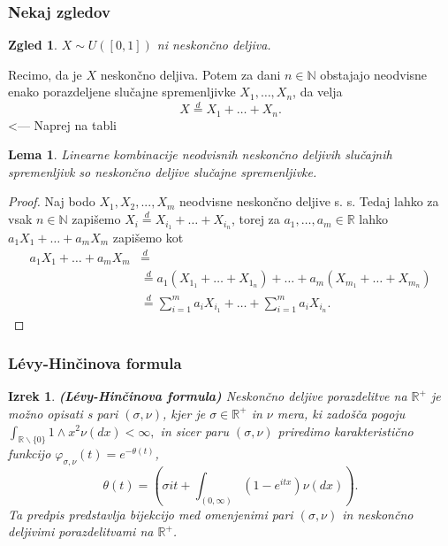 \documentclass[]{beamer} %
\theoremstyle{plain}
\newtheorem{izrek}{Izrek}
\newtheorem{zgled}{Zgled}
\newtheorem{lema}{Lema}
\begin{document}
\begin{frame}
  \frametitle{Nekaj zgledov}
  \begin{zgled}
    $ X\sim \textit{U}([0, 1])$ ni neskončno deljiva.
  \end{zgled}
  \pause
  Recimo, da je $X$ neskončno deljiva. Potem za dani $n \in \mathbb{N}$ obstajajo
  neodvisne enako porazdeljene slučajne spremenljivke $X_1, \dots, X_n$, da velja
  $$
  X \stackrel{d}{=} X_1 + \dots + X_n.
  $$
  \pause
  <--- Naprej na tabli



\end{frame}


\begin{frame}
  \begin{lema}
    Linearne kombinacije neodvisnih neskončno deljivih slučajnih spremenljivk so neskončno deljive slučajne spremenljivke.
\end{lema}

\pause
\begin{proof}
    Naj bodo $X_1, X_2, ..., X_m$ neodvisne neskončno deljive s. s. Tedaj lahko za vsak $n \in \mathbb{N}$ 
    zapišemo $X_i \stackrel{d}{=} X_{i_1} + \dots + X_{i_n}$, torej za
    $a_1, \dots, a_m \in \mathbb{R}$ lahko $a_1X_1 + \dots + a_mX_m$ zapišemo kot 
    \begin{align*}
        a_1X_1 + \dots + a_mX_m &\stackrel{d}{=} \\
                                &\stackrel{d}{=} a_1(X_{1_1} + \dots + X_{1_n}) + \dots + a_m(X_{m_1} + \dots + X_{m_n}) \\
                                &\stackrel{d}{=} \sum_{i=1}^ma_iX_{i_1} + \dots + \sum_{i=1}^ma_iX_{i_n}.
    \end{align*}
\end{proof}
\end{frame}


\begin{frame}
  \frametitle{Lévy-Hinčinova formula}
  \begin{izrek}
    \textbf{(Lévy-Hinčinova formula)} 
    Neskončno deljive porazdelitve na $\mathbb{R}^+$ je možno opisati s pari $(\sigma, \nu)$, kjer je 
    $\sigma \in \mathbb{R}^+$ in $\nu$ mera, ki zadošča pogoju $\int_{\mathbb{R}\backslash\{0\}}1 \wedge x^2 \nu(dx)< \infty,$
    in sicer paru $(\sigma, \nu)$ priredimo karakteristično funkcijo $\varphi_{\sigma, \nu}(t) = e^{-\theta(t)}$,
    $$
    \theta(t) = \left(\sigma i t + \int_{(0, \infty)}(1 - e^{i t x}) \nu(dx)\right).
    $$
    Ta predpis predstavlja bijekcijo med omenjenimi pari  $(\sigma, \nu)$ in neskončno deljivimi porazdelitvami na $\mathbb{R}^+$.
  \end{izrek}
\end{frame}
\end{document}
